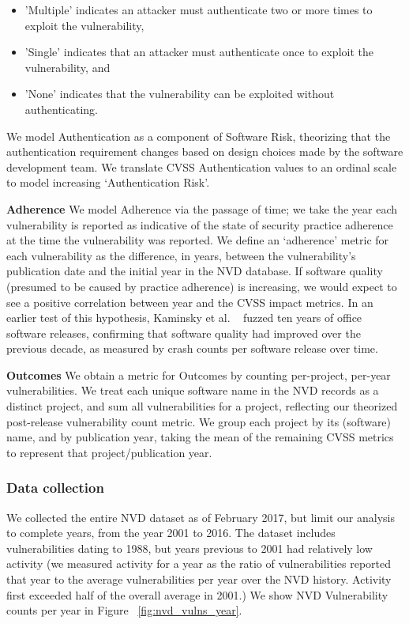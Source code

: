 \begin{itemize}
\begin{itemize}
		\item 'Multiple' indicates an attacker must authenticate two or more times to exploit the vulnerability, 
		\item 'Single' indicates that an attacker must authenticate once to exploit the vulnerability, and 
		\item 'None' indicates that the vulnerability can be exploited without authenticating.  
	\end{itemize}
	We model Authentication as a component of Software Risk, theorizing that the authentication requirement changes based on design choices made by the software development team. We translate CVSS Authentication values to an ordinal scale to model increasing `Authentication Risk'.
\end{itemize}
  
\textbf{Adherence}
We model Adherence via the passage of time; we take the year each vulnerability is reported as indicative of the state of security practice adherence at the time the vulnerability was reported. We define an `adherence' metric for each vulnerability as the difference, in years, between the vulnerability's publication date and the initial year in the NVD database. If software quality (presumed to be caused by practice adherence) is increasing, we would expect to see a positive correlation between year and the CVSS impact metrics.  In an earlier test of this hypothesis, Kaminsky et al. ~\cite{kaminsky2011showing} fuzzed ten years of office software releases, confirming that software quality had improved over the previous decade, as measured by crash counts per software release over time. 
    
\textbf{Outcomes}
We obtain a metric for Outcomes by counting per-project, per-year vulnerabilities. We treat each unique software name in the NVD records as a distinct project, and sum all vulnerabilities for a project, reflecting our theorized post-release vulnerability count metric. We group each project by its (software) name, and by publication year, taking the mean of the remaining CVSS metrics to represent that project/publication year. 


	
\subsubsection{Data collection}
We collected the entire NVD dataset as of February 2017, but limit our analysis to complete years, from the year 2001 to 2016. The dataset includes vulnerabilities dating to 1988, but years previous to 2001 had relatively low activity (we measured activity for a year as the ratio of vulnerabilities reported that year to the average vulnerabilities per year over the NVD history. Activity first exceeded half of the overall average in 2001.) We show NVD Vulnerability counts per year in Figure ~\ref{fig:nvd_vulns_year}.

